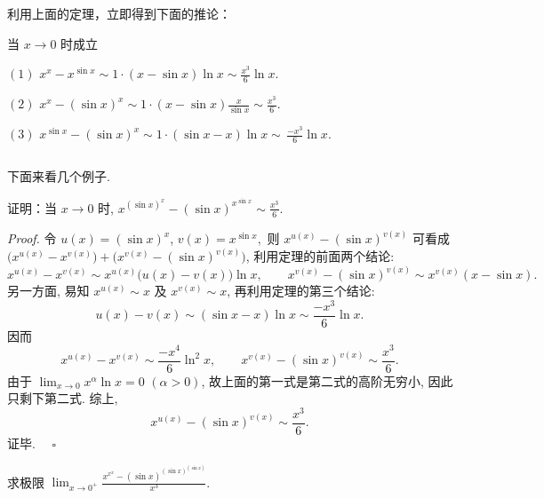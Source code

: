 利用上面的定理，立即得到下面的推论：

\begin{corollary}{}
当 $x\to0$ 时成立

$(1)$ $x^{x}-x^{\sin x}\sim1\cdot(x-\sin x)\ln x\sim\frac{x^{3}}{6}\ln x.$

$(2)$ $x^{x}-(\sin x)^{x}\sim1\cdot(x-\sin x)\frac{x}{\sin x}\sim\frac{x^{3}}{6}.$

$(3)$ $x^{\sin x}-(\sin x)^{x}\sim1\cdot(\sin x-x)\ln x\sim\,\frac{-x^{3}}{6}\ln x.$
\end{corollary}

$$~$$ 

下面来看几个例子.

\begin{example}{}
证明：当 $x\to0$ 时, $x^{(\sin x)^{x}}-(\sin x)^{x^{\sin x}}\sim\frac{x^{3}}{6}.$ 
\end{example}
\textsl{Proof.} 令 $u(x)=(\sin x)^{x}$, $v(x)=x^{\sin x},$ 则 $x^{u(x)}-(\sin x)^{v(x)}$
可看成 $\big(x^{u(x)}-x^{v(x)}\big)+\big(x^{v(x)}-(\sin x)^{v(x)}\big)$,
利用定理的前面两个结论: 
\[
x^{u(x)}-x^{v(x)}\sim x^{u(x)}\big(u(x)-v(x)\big)\ln x,\qquad x^{v(x)}-(\sin x)^{v(x)}\sim x^{v(x)}(x-\sin x).~
\]
另一方面, 易知 $x^{u(x)}\sim x$ 及 $x^{v(x)}\sim x$, 再利用定理的第三个结论: 
\[
u(x)-v(x)\sim(\sin x-x)\ln x\sim\frac{-x^{3}}{6}\ln x.~
\]
因而 
\[
x^{u(x)}-x^{v(x)}\sim\frac{-x^{4}}{6}\ln^{2}x,\qquad x^{v(x)}-(\sin x)^{v(x)}\sim\frac{x^{3}}{6}.~
\]
由于 ${\displaystyle \lim_{x\to0}x^{\alpha}\ln x=0}$ $(\alpha>0)$,
故上面的第一式是第二式的高阶无穷小, 因此只剩下第二式. 综上, $$x^{u(x)}-(\sin x)^{v(x)}\sim\frac{x^{3}}{6}.~$$  证毕. $\quad\square$

\begin{exercise}{}
求极限 $\displaystyle\lim_{x\to 0^+}\frac{x^{x^x}-(\sin x)^{(\sin x)^{(\sin x)}}}{x^3}$.
\end{exercise}